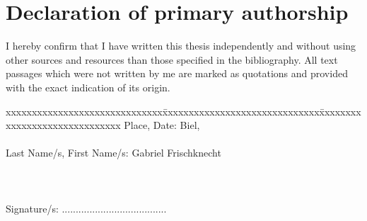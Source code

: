 \chapter*{Declaration of primary authorship}
\label{chap:declaration_authorship}

\vspace*{10mm} 

I hereby confirm that I  have written this thesis independently and without using other sources and resources than those specified in the bibliography. All text passages which were not written by me are marked as quotations and provided with the exact indication of its origin. 

\vspace{15mm}

\begin{tabbing}
xxxxxxxxxxxxxxxxxxxxxxxxxxxxxx\=xxxxxxxxxxxxxxxxxxxxxxxxxxxxxx\=xxxxxxxxxxxxxxxxxxxxxxxxxxxxxx\kill
Place, Date:		\> Biel, \versiondate \\ \\ 
Last Name/s, First Name/s:	\> Gabriel Frischknecht 	 \\ \\ \\ \\ 
Signature/s:	\> ......................................\> \\
\end{tabbing}
